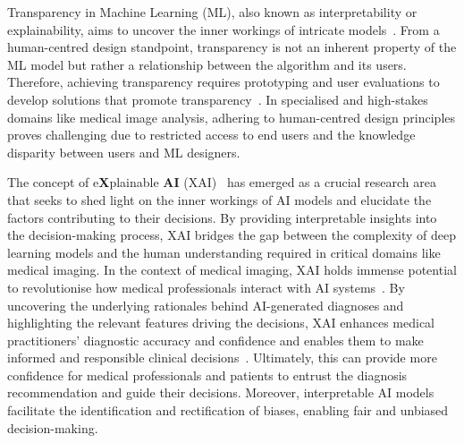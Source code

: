 \documentclass[dvipsnames]{article}
\renewcommand{\cite}[1]{\autocite{#1}}
\begin{document}
Transparency in Machine Learning (ML), also known as interpretability or explainability, aims to uncover the inner workings of intricate models~\cite{gilpin2018explaining}. From a human-centred design standpoint, transparency is not an inherent property of the ML model but rather a relationship between the algorithm and its users. Therefore, achieving transparency requires prototyping and user evaluations to develop solutions that promote transparency~\cite{balasubramaniam2022transparency}.
In specialised and high-stakes domains like medical image analysis, adhering to human-centred design principles proves challenging due to restricted access to end users and the knowledge disparity between users and ML designers.

The concept of e\textbf{X}plainable \textbf{AI} (XAI)~\cite{arrieta2020explainable} has emerged as a crucial research area that seeks to shed light on the inner workings of AI models and elucidate the factors contributing to their decisions. By providing interpretable insights into the decision-making process, XAI bridges the gap between the complexity of deep learning models and the human understanding required in critical domains like medical imaging.
In the context of medical imaging, XAI holds immense potential to revolutionise how medical professionals interact with AI systems~\cite{banerjee2020medical}. By uncovering the underlying rationales behind AI-generated diagnoses and highlighting the relevant features driving the decisions, XAI enhances medical practitioners' diagnostic accuracy and confidence and enables them to make informed and responsible clinical decisions~\cite{loh2022application}.
Ultimately, this can provide more confidence for medical professionals and patients to entrust the diagnosis recommendation and guide their decisions.
Moreover, interpretable AI models facilitate the identification and rectification of biases, enabling fair and unbiased decision-making.
\end{document}

